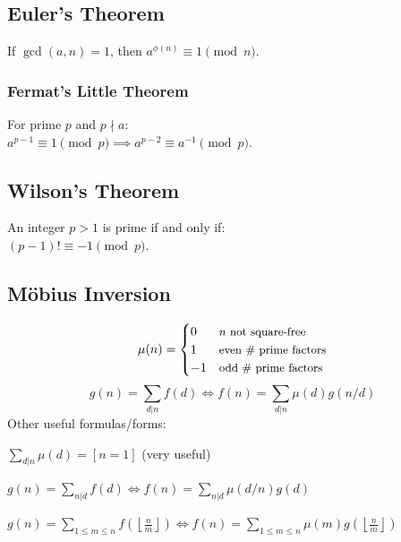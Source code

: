 \subsection{Euler's Theorem}
\raggedright
If $\gcd(a,n)=1$, then $a^{\phi(n)} \equiv 1 \pmod n$.

\subsubsection{Fermat's Little Theorem}
For prime $p$ and $p \nmid a$: \\
$a^{p-1} \equiv 1 \pmod p \implies a^{p-2} \equiv a^{-1} \pmod p$.

\subsection{Wilson's Theorem}
\raggedright
An integer $p > 1$ is prime if and only if: \\
$(p-1)! \equiv -1 \pmod p$.

\subsection{Möbius Inversion}
\[
\mu(n) = \begin{cases} 
  0 & \text{\small $n$ not square-free} \\ 
  1 & \text{\small even \# prime factors} \\ 
  -1 & \text{\small odd \# prime factors}
\end{cases}
\]
\[ g(n) = \sum_{d|n} f(d) \Leftrightarrow f(n) = \sum_{d|n} \mu(d)g(n/d) \]
  Other useful formulas/forms:

  $ \sum_{d | n} \mu(d) = [ n = 1] $ (very useful)

  $ g(n) = \sum_{n|d} f(d) \Leftrightarrow f(n) = \sum_{n|d} \mu(d/n)g(d)$

 $ g(n) = \sum_{1 \leq m \leq n} f(\left\lfloor\frac{n}{m}\right \rfloor ) \Leftrightarrow f(n) = \sum_{1\leq m\leq n} \mu(m)g(\left\lfloor\frac{n}{m}\right\rfloor)$